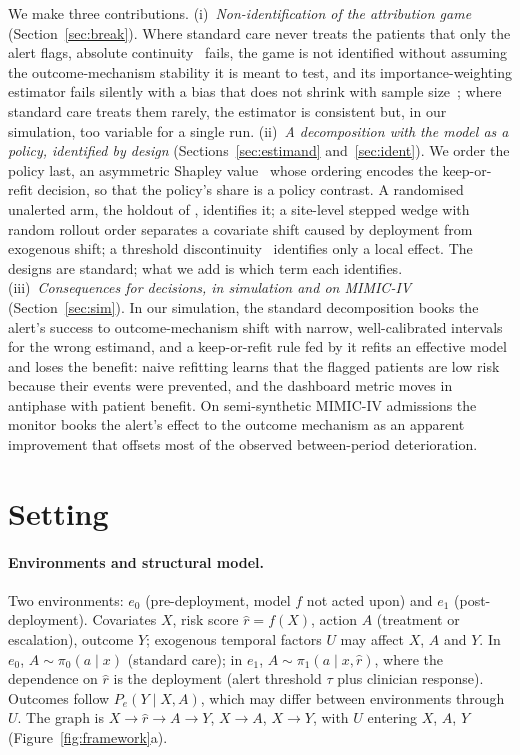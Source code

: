 \documentclass[letterpaper]{article} %
\newcommand{\rhat}{\hat r}
\begin{document}
We make three contributions.
(i)~\emph{Non-identification of the attribution game} (Section~\ref{sec:break}).
Where
standard care never treats the patients that only the alert flags, absolute
continuity~\citep{boeken2024evaluating} fails, the game is not identified without assuming the
outcome-mechanism stability it is meant to test, and its importance-weighting
estimator fails silently with a bias that does not shrink with sample
size~\citep{petersen2012positivity}; where standard care treats them rarely,
the estimator is consistent but, in our simulation, too variable for a
single run.
(ii)~\emph{A decomposition with the model as a policy, identified by design}
(Sections~\ref{sec:estimand} and~\ref{sec:ident}). We order the policy last, an asymmetric Shapley
value~\citep{frye2020asymmetric} whose ordering encodes the keep-or-refit
decision, so that the policy's share is a policy contrast. A randomised
unalerted arm, the holdout of \citet{liley2021model}, identifies it; a
site-level stepped wedge with random rollout order separates a covariate
shift caused by deployment from exogenous shift; a threshold
discontinuity~\citep{gallo2024effectiveness} identifies only a local effect.
The designs are standard; what we add is which term each identifies.
(iii)~\emph{Consequences for decisions, in simulation and on MIMIC-IV}
(Section~\ref{sec:sim}). In our simulation, the standard decomposition books the alert's success
to outcome-mechanism shift with narrow, well-calibrated intervals for the wrong
estimand, and a keep-or-refit rule fed by it refits an effective model and
loses the benefit: naive refitting learns that the flagged patients are low
risk because their events were prevented, and the dashboard metric moves in
antiphase with patient benefit. On semi-synthetic MIMIC-IV admissions
the monitor books the alert's effect to the outcome mechanism as an apparent
improvement that offsets most of the observed between-period deterioration.

\section{Setting}
\label{sec:setting}

\paragraph{Environments and structural model.} Two environments: $e_0$
(pre-deployment, model $f$ not acted upon) and $e_1$ (post-deployment).
Covariates $X$, risk score $\rhat = f(X)$, action $A$ (treatment or
escalation), outcome $Y$; exogenous temporal factors $U$ may affect $X$, $A$
and $Y$. In $e_0$, $A \sim \pi_0(a \mid x)$ (standard care); in $e_1$,
$A \sim \pi_1(a \mid x, \rhat)$, where the dependence on $\rhat$ is the
deployment (alert threshold $\tau$ plus clinician response). Outcomes follow
$P_e(Y \mid X, A)$, which may differ between environments through $U$. The
graph is $X \to \rhat \to A \to Y$, $X \to A$, $X \to Y$, with $U$ entering
$X$, $A$, $Y$ (Figure~\ref{fig:framework}a).
\end{document}
